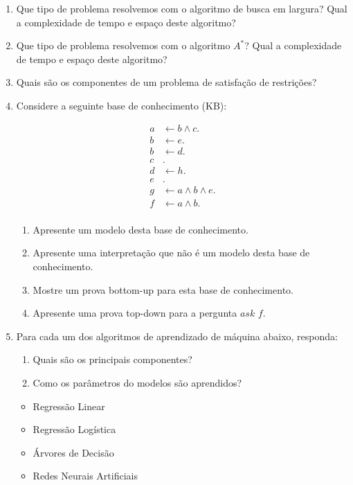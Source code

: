 \documentclass{article}
\begin{document}
\begin{enumerate}

    \item Que tipo de problema resolvemos com o algoritmo de busca em largura? Qual a complexidade de tempo e espaço deste algoritmo?
    
    \item Que tipo de problema resolvemos com o algoritmo $A^*$? Qual a complexidade de tempo e espaço deste algoritmo?
    
    \item Quais são os componentes de um problema de satisfação de restrições?
    
    \item Considere a seguinte base de conhecimento (KB):
    \vspace{-0.5 cm}
    
    \begin{center}
        \begin{align*}
         a & \leftarrow b \wedge c. \\ 
         b & \leftarrow e. \\ 
         b & \leftarrow d. \\ 
         c &. \\ 
         d & \leftarrow h. \\ 
         e &. \\
         g & \leftarrow a \wedge b  \wedge e. \\
         f & \leftarrow a \wedge b. \\  
        \end{align*}
    \end{center}
    
    
    \begin{enumerate} 
        \item Apresente um modelo desta base de conhecimento.
        \item Apresente uma interpretação que não é um modelo desta base de conhecimento.
        \item Mostre um prova bottom-up para esta base de conhecimento. 
        \item Apresente uma prova top-down para a pergunta $ask$ $f$.
    \end{enumerate}
    
    \item Para cada um dos algoritmos de aprendizado de máquina abaixo, responda:

    \begin{enumerate}
        \item Quais são os principais componentes?
        \item Como os parâmetros do modelos são aprendidos?
    \end{enumerate}

    \begin{itemize}
        \item Regressão Linear
        \item Regressão Logística
        \item Árvores de Decisão
        \item Redes Neurais Artificiais
    \end{itemize}



    
    \end{enumerate}
\end{document}

